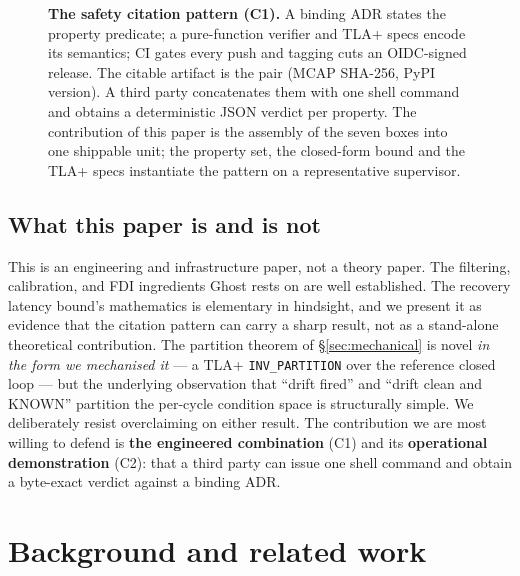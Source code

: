 \documentclass[11pt,a4paper]{article}
\begin{document}
\begin{figure}[t]
\caption{\textbf{The safety citation pattern (C1).} A binding ADR
states the property predicate; a pure-function verifier and TLA+
specs encode its semantics; CI gates every push and tagging cuts an
OIDC-signed release. The citable artifact is the pair
(MCAP SHA-256, PyPI version). A third party concatenates them with
one shell command and obtains a deterministic JSON verdict per
property. The contribution of this paper is the assembly of the
seven boxes into one shippable unit; the property set, the
closed-form bound and the TLA+ specs instantiate the pattern on a
representative supervisor.}
\label{fig:pattern}
\end{figure}

\subsection{What this paper is and is not}

This is an engineering and infrastructure paper, not a theory paper.
The filtering, calibration, and FDI ingredients Ghost rests on are
well established. The recovery latency bound's mathematics is elementary
in hindsight, and we present it as evidence that the citation
pattern can carry a sharp result, not as a stand-alone theoretical
contribution. The partition theorem of \S\ref{sec:mechanical} is
novel \emph{in the form we mechanised it} --- a TLA+
\texttt{INV\_PARTITION} over the reference closed loop --- but the
underlying observation that ``drift fired'' and ``drift clean and
KNOWN'' partition the per-cycle condition space is structurally
simple. We deliberately resist overclaiming on either result. The
contribution we are most willing to defend is \textbf{the engineered
combination} (C1) and its \textbf{operational demonstration} (C2):
that a third party can issue one shell command and obtain a
byte-exact verdict against a binding ADR.

\section{Background and related work}
\label{sec:related}
\end{document}
